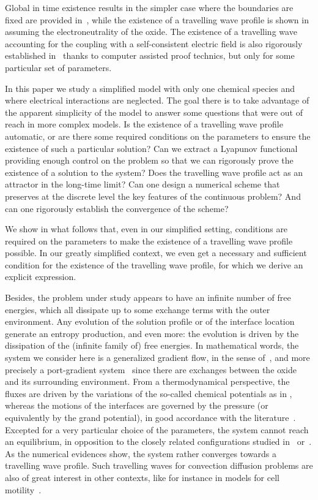 \documentclass{amsart}
\begin{document}
Global in time existence results in the simpler case where the boundaries are fixed are provided in~\cite{Chainais_dcds, Cances_ZAMP}, while the existence of a travelling wave profile is shown in \cite{ChainGall} assuming the electroneutrality of the oxide. The existence of a travelling wave accounting for the coupling with a self-consistent electric field is also rigorously established in~\cite{Breden} thanks to computer assisted proof technics, but only for some particular set of parameters. 

In this paper we study a simplified model with only one chemical species and where electrical interactions are neglected. The goal there is to take advantage of the apparent simplicity of the model to answer some questions that were out of reach in more complex models. Is the existence of a travelling wave profile automatic, or are there some required conditions on the parameters to ensure the existence of such a particular solution? Can we extract a Lyapunov functional providing enough control on the problem so that we can rigorously prove the existence of a solution to the system? Does the travelling wave profile act as an attractor in the long-time limit? 
Can one design a numerical scheme that preserves at the discrete level the key features of the continuous problem? And can one rigorously establish the convergence of the scheme?

We show in what follows that, even in our simplified setting, conditions are required on the parameters to make the existence of a travelling wave profile possible. 
In our greatly simplified context, we even get a necessary and sufficient condition for the existence of the travelling wave profile, for which we derive an explicit expression. 

Besides, the problem under study appears to have an infinite number of free energies, which all dissipate up to some exchange terms with the outer environment. 
Any evolution of the solution profile or of the interface location generate an entropy production, and even more: the evolution is driven by the dissipation of the (infinite family of) free energies. In mathematical words, the system we consider here is a generalized gradient flow, in the sense of~\cite{Mie11}, and more precisely a port-gradient system~\cite{Mielke} since there are exchanges between the oxide and its surrounding environment. 
From a thermodynamical perspective, the fluxes are driven by the variations of the so-called chemical potentials as in \cite{Cances_ZAMP}, whereas the motions of the interfaces are governed by the 
pressure (or equivalently by the grand potential), in good accordance with the literature~\cite{PV99, CJ05, LLRV09}. Excepted for a very particular choice of the parameters, the system cannot reach an equilibrium, in opposition to the closely related configurations studied  in~\cite{PP10} or~\cite{CCCE_IFB}. As the numerical evidences show, the system rather converges towards a travelling wave profile. 
Such travelling waves for convection diffusion problems are also of great interest in other contexts, like for instance in models for cell motility~\cite{RB23, AM_arXiv}. 
\end{document}
